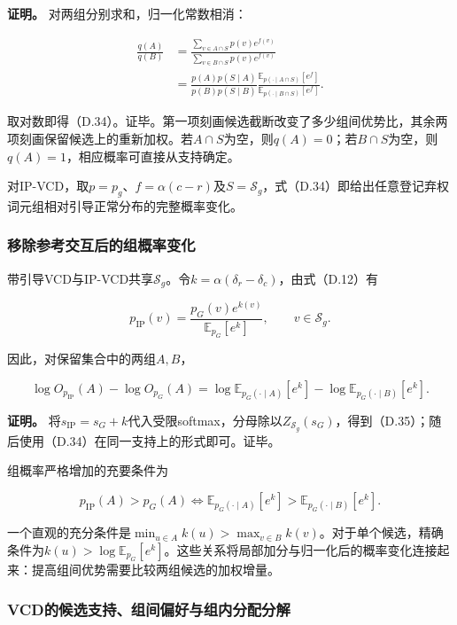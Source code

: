 \textbf{证明。} 对两组分别求和，归一化常数相消：

\[
\begin{aligned}
\frac{q(A)}{q(B)}
&=\frac{\sum_{v\in A\cap S}p(v)e^{f(v)}}{\sum_{v\in B\cap S}p(v)e^{f(v)}}\\
&=\frac{p(A)p(S\mid A)}{p(B)p(S\mid B)}
\frac{\mathbb E_{p(\cdot\mid A\cap S)}[e^f]}{\mathbb E_{p(\cdot\mid B\cap S)}[e^f]}.
\end{aligned}
\]

取对数即得（D.34）。证毕。第一项刻画候选截断改变了多少组间优势比，其余两项刻画保留候选上的重新加权。若\(A\cap S\)为空，则\(q(A)=0\)；若\(B\cap S\)为空，则\(q(A)=1\)，相应概率可直接从支持确定。

对IP-VCD，取\(p=p_g\)、\(f=\alpha(c-r)\)及\(S=\mathcal S_g\)，式（D.34）即给出任意登记弃权词元组相对引导正常分布的完整概率变化。

\subsubsection{移除参考交互后的组概率变化}\label{ux79fbux9664ux53c2ux8003ux4ea4ux4e92ux540eux7684ux7ec4ux6982ux7387ux53d8ux5316}

带引导VCD与IP-VCD共享\(\mathcal S_g\)。令\(k=\alpha(\delta_r-\delta_c)\)，由式（D.12）有

\[
p_{\mathrm{IP}}(v)
=\frac{p_G(v)e^{k(v)}}{\mathbb E_{p_G}[e^k]},\qquad v\in\mathcal S_g.
\tag{D.35}
\]

因此，对保留集合中的两组\(A,B\)，

\[
\log O_{p_{\mathrm{IP}}}(A)-\log O_{p_G}(A)
=\log\mathbb E_{p_G(\cdot\mid A)}[e^k]
-\log\mathbb E_{p_G(\cdot\mid B)}[e^k].
\tag{D.36}
\]

\textbf{证明。} 将\(s_{\mathrm{IP}}=s_G+k\)代入受限softmax，分母除以\(Z_{\mathcal S_g}(s_G)\)，得到（D.35）；随后使用（D.34）在同一支持上的形式即可。证毕。

组概率严格增加的充要条件为

\[
p_{\mathrm{IP}}(A)>p_G(A)
\iff
\mathbb E_{p_G(\cdot\mid A)}[e^k]
>\mathbb E_{p_G(\cdot\mid B)}[e^k].
\tag{D.37}
\]

一个直观的充分条件是\(\min_{u\in A}k(u)>\max_{v\in B}k(v)\)。对于单个候选，精确条件为\(k(u)>\log\mathbb E_{p_G}[e^k]\)。这些关系将局部加分与归一化后的概率变化连接起来：提高组间优势需要比较两组候选的加权增量。

\subsubsection{VCD的候选支持、组间偏好与组内分配分解}\label{vcdux7684ux5019ux9009ux652fux6301ux7ec4ux95f4ux504fux597dux4e0eux7ec4ux5185ux5206ux914dux5206ux89e3}


